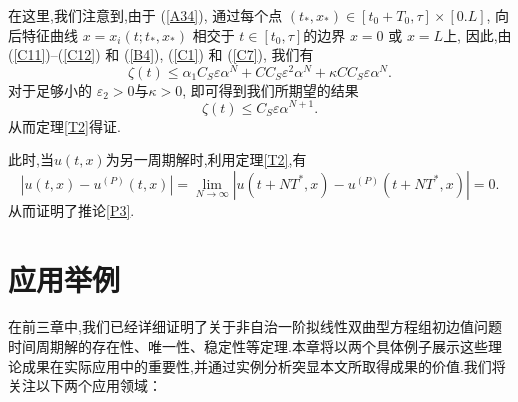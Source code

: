 \documentclass[notitlepage,cs4size,punct,oneside]{ctexrep}
\numberwithin{equation}{chapter}
\theoremstyle{mystyle}
\begin{document}
在这里,我们注意到,由于 (\ref{A34}), 通过每个点 $\left(t_{*}, x_{*}\right) \in\left[t_{0}+T_{0}, \tau\right] \times[0 . L]$, 向后特征曲线 $x=x_{i}\left(t ; t_{*}, x_{*}\right)$ 相交于 $t \in\left[t_{0}, \tau\right]$的边界 $x=0$ 或 $x=L$上, 因此,由 (\ref{C11})--(\ref{C12}) 和  (\ref{B4}), (\ref{C1}) 和 (\ref{C7}), 我们有
\begin{equation}\label{C17}
    \zeta(t) \leq \alpha_{1} C_{S} \varepsilon \alpha^{N}+C C_{S} \varepsilon^{2} \alpha^{N} + \kappa C C_{S} \varepsilon \alpha^{N}.
\end{equation}
对于足够小的 $\varepsilon_{2}>0$与$\kappa >0$, 即可得到我们所期望的结果
\begin{equation}\label{C18}
    \zeta(t) \leq C_{S} \varepsilon \alpha^{N+1}.
\end{equation}
从而定理\ref{T2}得证.

此时,当$u(t,x)$为另一周期解时,利用定理\ref{T2},有
\begin{equation}
    |u(t,x)-u^{(P)}(t,x)|=\lim_{N \to \infty} |u(t+NT^{*},x)-u^{(P)}(t+NT^{*},x)| =0.
\end{equation}
从而证明了推论\ref{P3}.
\chapter{应用举例}
在前三章中,我们已经详细证明了关于非自治一阶拟线性双曲型方程组初边值问题时间周期解的存在性、唯一性、稳定性等定理.本章将以两个具体例子展示这些理论成果在实际应用中的重要性,并通过实例分析突显本文所取得成果的价值.我们将关注以下两个应用领域：
\end{document}
